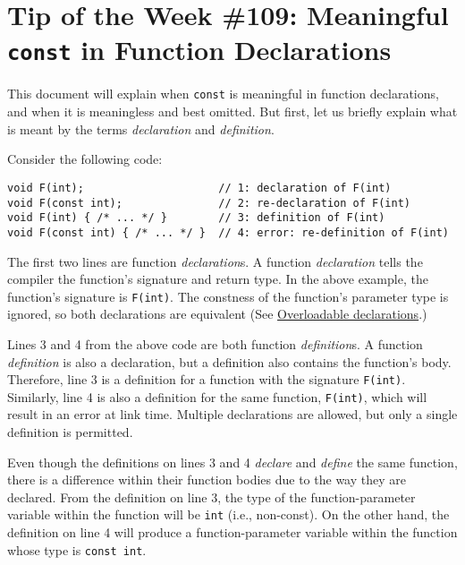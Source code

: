 
\chapter{Tip of the Week \#109: Meaningful \texorpdfstring{\texttt{const}}{} in Function Declarations}\label{ch:tip-of-the-week-109}

This document will explain when \texttt{const} is meaningful in function declarations, and when it is meaningless and best omitted. But first, let us briefly explain what is meant by the terms \emph{declaration} and \emph{definition}.

Consider the following code:
\begin{verbatim}
void F(int);                     // 1: declaration of F(int)
void F(const int);               // 2: re-declaration of F(int)
void F(int) { /* ... */ }        // 3: definition of F(int)
void F(const int) { /* ... */ }  // 4: error: re-definition of F(int)
\end{verbatim}

The first two lines are function \emph{declaration}s. A function \emph{declaration} tells the compiler the function’s signature and return type. In the above example, the function’s signature is \texttt{F(int)}. The constness of the function’s parameter type is ignored, so both declarations are equivalent (See \href{http://eel.is/c++draft/over.load}{Overloadable declarations}.)

Lines 3 and 4 from the above code are both function \emph{definition}s. A function \emph{definition} is also a declaration, but a definition also contains the function’s body. Therefore, line 3 is a definition for a function with the signature \texttt{F(int)}. Similarly, line 4 is also a definition for the same function, \texttt{F(int)}, which will result in an error at link time. Multiple declarations are allowed, but only a single definition is permitted.

Even though the definitions on lines 3 and 4 \emph{declare} and \emph{define} the same function, there is a difference within their function bodies due to the way they are declared. From the definition on line 3, the type of the function-parameter variable within the function will be \texttt{int} (i.e., non-const). On the other hand, the definition on line 4 will produce a function-parameter variable within the function whose type is \texttt{const int}.

